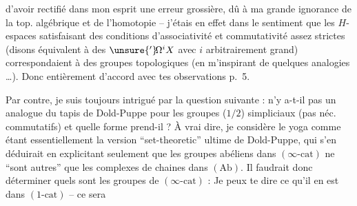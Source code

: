 d'avoir rectifié dans mon esprit une erreur grossière, dû à ma grande ignorance de la top. algébrique et de l'homotopie -- j'étais en effet dans le sentiment que les $H$-espaces satisfaisant des conditions d'associativité et commutativité assez strictes (disons équivalent à des $\unsure{{}'}\!\Omega^{i}X$ avec $i$ arbitrairement grand) correspondaient à des groupes topologiques  (en m'inspirant de quelques analogies \dots). Donc entièrement d'accord avec tes observations p.~5.

Par contre, je suis toujours intrigué par la question suivante : n'y a-t-il pas un analogue du tapis de Dold-Puppe pour les groupes ($1/2$) simpliciaux (pas néc. commutatifs) et quelle forme prend-il ? À vrai dire, je considère le yoga
comme étant essentiellement la version ``set-theoretic'' ultime de Dold-Puppe, qui s'en déduirait en explicitant seulement que les groupes abéliens dans $(\infty\text{-cat})$ ne ``sont autres'' que les complexes de chaines dans $(\mathrm{Ab})$. Il faudrait donc déterminer quels sont les groupes de $(\infty\text{-cat})$ : Je peux te dire ce qu'il en est dans $(1\text{-cat})$ -- ce sera %
